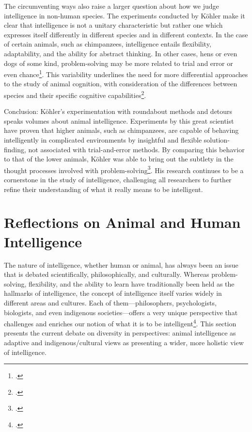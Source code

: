 \documentclass[12pt]{article}
\begin{document}
The circumventing ways also raise a larger question about how we judge intelligence in non-human species. The experiments conducted by Köhler make it clear that intelligence is not a unitary characteristic but rather one which expresses itself differently in different species and in different contexts. In the case of certain animals, such as chimpanzees, intelligence entails flexibility, adaptability, and the ability for abstract thinking. In other cases, hens or even dogs of some kind, problem-solving may be more related to trial and error or even chance\footcite{thorndike1898animal}. This variability underlines the need for more differential approaches to the study of animal cognition, with consideration of the differences between species and their specific cognitive capabilities\footcite{morgan1894animal}.

Conclusion: Köhler's experimentation with roundabout methods and detours speaks volumes about animal intelligence. Experiments by this great scientist have proven that higher animals, such as chimpanzees, are capable of behaving intelligently in complicated environments by insightful and flexible solution-finding, not associated with trial-and-error methods. By comparing this behavior to that of the lower animals, Köhler was able to bring out the subtlety in the thought processes involved with problem-solving\footcite{koehler1921mentality}. His research continues to be a cornerstone in the study of intelligence, challenging all researchers to further refine their understanding of what it really means to be intelligent.

\newpage





\section{Reflections on Animal and Human Intelligence}

The nature of intelligence, whether human or animal, has always been an issue that is debated scientifically, philosophically, and culturally. Whereas problem-solving, flexibility, and the ability to learn have traditionally been held as the hallmarks of intelligence, the concept of intelligence itself varies widely in different areas and cultures. Each of them—philosophers, psychologists, biologists, and even indigenous societies—offers a very unique perspective that challenges and enriches our notion of what it is to be intelligent\footcite{gardner1999intelligence}. This section presents the current debate on diversity in perspectives: animal intelligence as adaptive and indigenous/cultural views as presenting a wider, more holistic view of intelligence.
\end{document}
